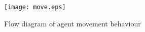 

\begin{figure}[h!]
    \centering
    \texttt{[image: move.eps]}
    \caption{Flow diagram of agent movement behaviour}\label{fig:move}
\end{figure}

